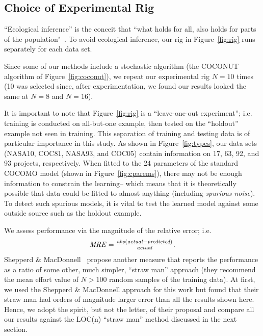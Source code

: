 \documentclass[smallcondesed]{svjour3}
\newcommand{\fig}[1]{Figure~\ref{fig:#1}}
\newenvironment{changed}{\par}{\par}
\begin{document}
\subsection{Choice of Experimental Rig}




``Ecological inference''
is the conceit 
that ``what holds for all, also holds for parts 
of the population"~\cite{posnet11,me12d}.
To avoid ecological inference,
our  rig in Figure~\ref{fig:rig}
runs separately for each data set.  


Since some of our methods include a stochastic
algorithm (the COCONUT algorithm of \fig{coconut}),
we repeat our experimental rig   $N=10$ times
(10 was selected since, after experimentation, we
found our results looked the same at $N=8$ and
$N=16$).



\begin{changed}
It is important to note that Figure~\ref{fig:rig} is a ``leave-one-out experiment''; i.e.
training is conducted on all-but-one example, then tested
on the ``holdout'' example not seen in training. This separation of training and testing
data is of particular
importance in this study. 
As shown in \fig{types}, our  data sets (NASA10, COC81, NASA93, and COC05)
contain information on 17, 63, 92, and 93  projects, respectively. When fitted to
the   24 parameters of the standard COCOMO model  (shown in \fig{cparems}),
there may not be enough information to constrain the learning-- which means that it is theoretically
possible that data could be fitted to almost anything (including {\em spurious noise}).
To detect such spurious models, it is vital to test the learned model against some
outside source such as the holdout example.
\end{changed} 

We assess  
performance via the magnitude of the relative error; i.e.
\begin{equation}\label{eq:mre}
\mbox{$ \mathit{MRE}=\frac{abs(\mathit{actual} - \mathit{predicted})}{\mathit{actual}}$}.
\end{equation}
Shepperd \& MacDonnell~\cite{shepperd12a} propose
another measure that reports the performance as a
ratio of some other, much
simpler, ``straw man'' approach (they recommend the
mean effort value of $N>100$ random samples of the
training data). At first, we used the Shepperd \&
MacDonnell approach for this work but found that
their straw man had orders of magnitude larger error
than all the results shown here. Hence, we adopt the
spirit, but not the letter, of their proposal and
compare all our results against the LOC(n) ``straw
man'' method discussed in the next section.
 
\end{document}
